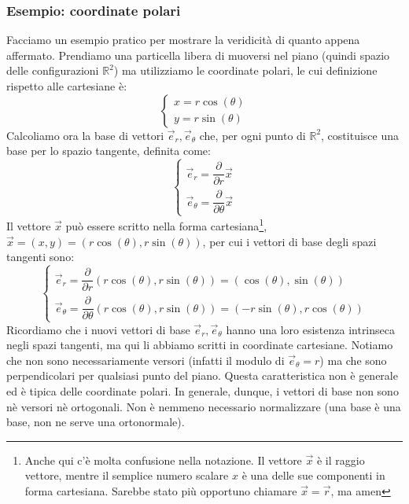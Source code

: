 \documentclass[a4paper,openany]{article}
\begin{document}
	\subsubsection{Esempio: coordinate polari}
	Facciamo un esempio pratico per mostrare la veridicità di quanto appena affermato. Prendiamo una particella libera di muoversi nel piano (quindi spazio delle configurazioni $\mathbb{R}^2$) ma utilizziamo le coordinate polari, le cui definizione rispetto alle cartesiane è:
	\begin{equation}
		\begin{cases}
			x = r\cos(\theta) \\
			y = r\sin(\theta)
		\end{cases}
	\end{equation}
	Calcoliamo ora la base di vettori $\vec{e}_{r}, \vec{e}_{\theta}$ che, per ogni punto di $\mathbb{R}^2$, costituisce una base per lo spazio tangente, definita come:
	\begin{equation}
		\begin{cases}
			\vec{e}_{r} = \dfrac{\partial}{\partial r}\vec{x} \\[6pt]
			\vec{e}_{\theta} = \dfrac{\partial}{\partial \theta}\vec{x}
		\end{cases}
	\end{equation}
	Il vettore $\vec{x}$ può essere scritto nella forma cartesiana\footnote{Anche qui c'è molta confusione nella notazione. Il vettore $\vec{x}$ è il raggio vettore, mentre il semplice numero scalare $x$ è una delle sue componenti in forma cartesiana. Sarebbe stato più opportuno chiamare $\vec{x} = \vec{r}$, ma amen}, $\vec{x} = (x,y) = (r\cos(\theta), r\sin(\theta))$, per cui i vettori di base degli spazi tangenti sono:
	\begin{equation}
		\begin{cases}
			\vec{e}_{r} = \dfrac{\partial}{\partial r}(r\cos(\theta), r\sin(\theta)) = (\cos(\theta), \sin(\theta)) \\[6pt]
			\vec{e}_{\theta} = \dfrac{\partial}{\partial \theta}(r\cos(\theta), r\sin(\theta)) = (-r\sin(\theta), r\cos(\theta))
		\end{cases}
	\end{equation}
	Ricordiamo che i nuovi vettori di base $\vec{e}_{r}, \vec{e}_{\theta}$ hanno una loro esistenza intrinseca negli spazi tangenti, ma qui li abbiamo scritti in coordinate cartesiane. Notiamo che non sono necessariamente versori (infatti il modulo di $\vec{e}_{\theta} = r$) ma che sono perpendicolari per qualsiasi punto del piano. Questa caratteristica non è generale ed è tipica delle coordinate polari. In generale, dunque, i vettori di base non sono nè versori nè ortogonali. Non è nemmeno necessario normalizzare (una base è una base, non ne serve una ortonormale). 
	
\end{document}
